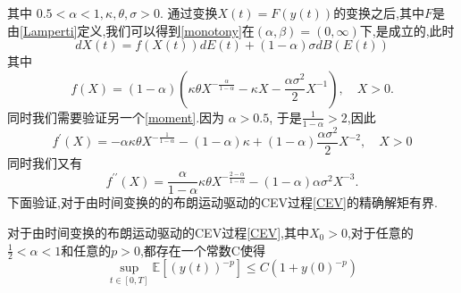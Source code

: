 其中 $0.5<\alpha<1,\kappa,\theta,\sigma>0.$ 通过变换$X(t)=F(y(t))$的变换之后,其中$F$是由\cref{Lamperti}定义,我们可以得到\cref{monotony}在$(\alpha,\beta)=(0,\infty)$下,是成立的,此时	$$dX(t)=f(X(t))dE(t)+(1-\alpha)\sigma dB(E(t))$$
其中
$$f(X)=(1-\alpha)\left(\kappa\theta X^{-\frac\alpha{1-\alpha}}-\kappa X-\frac{\alpha\sigma^2}2X^{-1}\right),\quad X>0.$$
同时我们需要验证另一个\cref{moment}.因为 $\alpha>0.5$, 于是$\frac{1}{1-\alpha}>2$,因此
$$f^{\prime}(X)=-\alpha\kappa\theta X^{-\frac1{1-\alpha}}-(1-\alpha)\kappa+(1-\alpha)\frac{\alpha\sigma^2}2X^{-2},\quad X>0$$
同时我们又有
$$f^{\prime\prime}(X)=\frac\alpha{1-\alpha}\kappa\theta X^{-\frac{2-\alpha}{1-\alpha}}-(1-\alpha)\alpha\sigma^2X^{-3}.$$
下面验证,对于由时间变换的的布朗运动驱动的CEV过程\cref{CEV}的精确解矩有界.
\begin{proposition}
	对于由时间变换的布朗运动驱动的CEV过程\cref{CEV},其中$X_0>0$,对于任意的$\frac{1}{2}<\alpha<1$和任意的$p>0$,都存在一个常数C使得
	\begin{equation*}
		\sup\limits_{t\in[0,T]}\mathbb{E}\left[\left(y(t)\right)^{-p}\right]\leq C(1+y(0)^{-p})
	\end{equation*}
\end{proposition}
